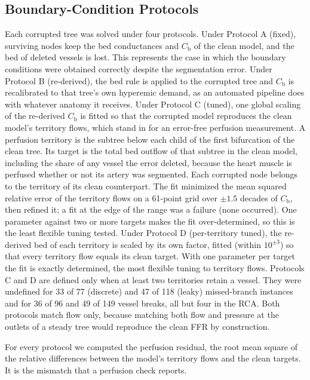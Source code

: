 \documentclass[journal,twoside,web]{ieeecolor}
\begin{document}
\subsection{Boundary-Condition Protocols}
Each corrupted tree was solved under four protocols. Under Protocol A (fixed), surviving
nodes keep the bed conductances and $C_\mathrm{b}$ of the clean model, and the bed of deleted vessels is lost. This represents
the case in which the boundary conditions were obtained correctly despite the segmentation error. Under Protocol B
(re-derived), the bed rule is applied to the corrupted tree and $C_\mathrm{b}$ is recalibrated to that tree's own hyperemic
demand, as an automated pipeline does with whatever anatomy it receives. Under Protocol C (tuned), one global
scaling of the re-derived $C_\mathrm{b}$ is fitted so that the corrupted model reproduces the clean model's territory
flows, which stand in for an error-free perfusion measurement. A perfusion territory is the subtree below each child of
the first bifurcation of the clean tree. Its target is the total bed outflow of that subtree in the clean model,
including the share of any vessel the error deleted, because the heart muscle is perfused whether or not its artery
was segmented. Each corrupted node belongs to the territory of its clean counterpart. The fit minimized the mean squared relative error of the territory flows on a 61-point grid over $\pm 1.5$ decades
of $C_\mathrm{b}$, then refined it; a fit at the edge of the range was a failure (none occurred).
One parameter against two or more targets makes the fit over-determined, so this is the least flexible tuning tested. Under Protocol D (per-territory tuned), the re-derived bed of each territory is scaled by its
own factor, fitted (within $10^{\pm 3}$) so that every territory flow equals its clean target. With one parameter per target the fit is
exactly determined, the most flexible tuning to territory flows. Protocols C and D are defined only when at least two territories retain a vessel. They were undefined for 33 of
77 (discrete) and 47 of 118 (leaky) missed-branch instances and for 36 of 96 and 49 of 149 vessel breaks, all but
four in the RCA. Both protocols match
flow only, because matching both flow and pressure at the outlets of a steady tree would reproduce the clean FFR by
construction.

For every protocol we computed the perfusion residual, the root mean square of the relative differences between the
model's territory flows and the clean targets. It is the mismatch that a perfusion check reports.
\end{document}
